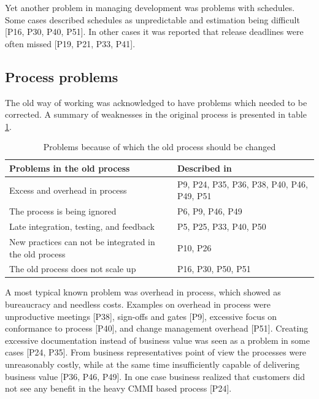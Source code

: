 Yet another problem in managing development was problems with schedules.
Some cases described schedules as unpredictable and estimation being difficult
[P16, P30, P40, P51]. In other cases it was reported that release deadlines were
often missed [P19, P21, P33, P41].

\subsection{Process problems}

The old way of working was acknowledged to have problems which needed to be
corrected. A summary of weaknesses in the original process is presented in table
\ref{table:reasonstochange_process}.

\begin{table}[b]
    \centering
    \begin{tabular}{ >{\raggedright\arraybackslash}p{}
                     >{\raggedright\arraybackslash}p{} }
        \toprule
        Problems in the old process           &  Described in  \\
        \midrule
        Excess and overhead in process     &  P9, P24, P35, P36, P38, P40, P46, P49, P51  \\
        The process is being ignored       &  P6, P9, P46, P49  \\
        Late integration, testing, and feedback  &  P5, P25, P33, P40, P50  \\
        New practices can not be integrated in the old process  &  P10, P26  \\
        The old process does not scale up  &  P16, P30, P50, P51  \\
        \bottomrule
    \end{tabular}
    \caption{Problems because of which the old process should be changed}
    \label{table:reasonstochange_process}
\end{table}

A most typical known problem was overhead in process, which showed as bureaucracy and
needless costs. Examples on overhead in process were unproductive meetings
[P38], sign-offs and gates [P9], excessive focus on conformance to process
[P40], and change management overhead [P51]. Creating excessive documentation
instead of business value was seen as a problem in some cases [P24, P35]. From
business representatives point of view the processes were unreasonably costly,
while at the same time insufficiently capable of delivering business value [P36,
P46, P49]. In one case business realized that customers did not see any benefit
in the heavy CMMI based process [P24].

